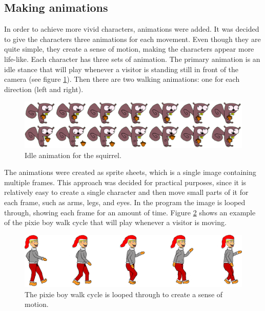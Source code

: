 \subsection{Making animations}
In order to achieve more vivid characters, animations were added. It was decided to give the characters three animations for each movement. Even though they are quite simple, they create a sense of motion, making the characters appear more life-like. Each character has three sets of animation. The primary animation is an idle stance that will play whenever a visitor is standing still in front of the camera (see figure \ref{fig:squirrel_animation}). Then there are two walking animations: one for each direction (left and right).

\begin{figure}[htbp]
\centering
\includegraphics[width=1.00\textwidth]{Pictures/Design/squirrel_animation}
\caption{Idle animation for the squirrel.}
\label{fig:squirrel_animation}
\end{figure}

The animations were created as sprite sheets, which is a single image containing multiple frames. This approach was decided for practical purposes, since it is relatively easy to create a single character and then move small parts of it for each frame, such as arms, legs, and eyes. In the program the image is looped through, showing each frame for an amount of time. Figure \ref{fig:Design_PixieBoyWalking} shows an example of the pixie boy walk cycle that will play whenever a visitor is moving.

\begin{figure}[htbp]
\centering
\includegraphics[width=1.00\textwidth]{Pictures/Design/PixieWalking.png}
\caption{The pixie boy walk cycle is looped through to create a sense of motion.}
\label{fig:Design_PixieBoyWalking}
\end{figure}